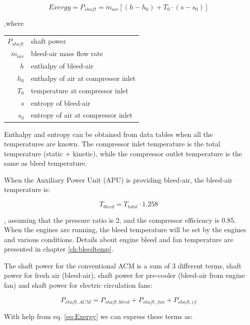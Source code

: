 \documentclass[english]{kththesis}
\begin{document}
\begin{equation}
\label{eq:Exergy}
Exergy = P_{shaft} = \dot{m}_{air} \left[ (h-h_0) + T_0 \cdot (s-s_0) \right]
\end{equation}

,where 

\begin{center}
\begin{tabular}{ r l }
 $P_{shaft}$ & shaft power \\ 
 $\dot{m}_{air}$ & bleed-air mass flow rate\\  
 $h$ & enthalpy of bleed-air \\
 $h_0$ & enthalpy of air at compressor inlet \\
 $T_0$ & temperature at compressor inlet \\
 $s$ & entropy of bleed-air \\
 $s_0$ & entropy of air at compressor inlet
\end{tabular}
\end{center}

Enthalpy and entropy can be obtained from data tables when all the temperatures are known. The compressor inlet temperature is the total temperature (static + kinetic), while the compressor outlet temperature is the same as bleed temperature.

When the Auxiliary Power Unit (APU) is providing bleed-air, the bleed-air temperature is:

\begin{equation}
\label{eq:Tapu}
T_{bleed} = T_{total} \cdot 1.258
\end{equation}

, assuming that the pressure ratio is 2, and the compressor efficiency is 0.85.
When the engines are running, the bleed temperature will be set by the engines and various conditions. Details about engine bleed and fan temperature are presented in chapter \ref{ch:bleedtemp}.

The shaft power for the conventional ACM is a sum of 3 different terms, shaft power for fresh air (bleed-air), shaft power for pre-cooler (bleed-air from engine fan) and shaft power for electric circulation fans:

\begin{equation}
\label{eq:ShaftPowerACM}
P_{shaft,ACM} = P_{shaft,bleed} + P_{shaft,fan} + P_{shaft,cf}
\end{equation}

With help from eq. \ref{eq:Exergy} we can express these terms as:
\end{document}
